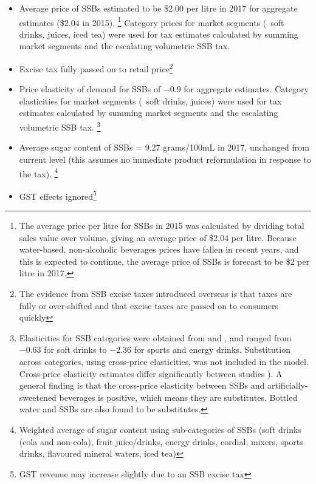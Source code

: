 \documentclass[embargoed]{grattan}
\begin{document}
\begin{itemize}
\item
  Average price of SSBs estimated to be \$2.00 per litre in 2017 for aggregate estimates (\$2.04 in 2015). \footnote{The average price per litre for SSBs in 2015 was calculated by dividing total sales value over volume, giving an average price of \$2.04 per litre.
Because water-based, non-alcoholic beverages prices have fallen in recent years, and this is expected to continue, the average price of SSBs is forecast to be \$2 per litre in 2017.} Category prices for market segments (\eg~soft drinks, juices, iced tea) were used for tax estimates calculated by summing market segments and the escalating volumetric SSB tax.
\item
  Excise tax fully passed on to retail price\footnote{The evidence from SSB excise taxes introduced overseas is that taxes are fully or over-shifted and that excise taxes are passed on to consumers quickly}
\item
  Price elasticity of demand for SSBs of \(-0.9\) for aggregate estimates.
Category elasticities for market segments (\eg~soft drinks, juices) were used for tax estimates calculated by summing market segments and the escalating volumetric SSB tax.%
\footnote{Elasticities for SSB categories were obtained from \textcite{Sharma2014effectstaxingsugarsweetened} and \textcite{Zhen2014Predictingeffectssugar}, and ranged from \(-0.63\) for soft drinks to \(-2.36\) for sports and energy drinks.
Substitution across categories, using cross-price elasticities, was not included in the model.
Cross-price elasticity estimates differ significantly between studies \textcite{Organization2016FiscalPoliciesDiet}).
A general finding is that the cross-price elasticity between SSBs and artificially-sweetened beverages is positive, which means they are substitutes.
Bottled water and SSBs are also found to be substitutes.}
\item
  Average sugar content of SSBs = 9.27 grams/100mL in 2017, unchanged from current level (this assumes no immediate product reformulation in response to the tax).%
\footnote{Weighted average of sugar content using sub-categories of SSBs (soft drinks (cola and non-cola), fruit juice/drinks, energy drinks, cordial, mixers, sports drinks, flavoured mineral waters, iced tea)\textcites{rethinksugarydrink2016Howmuchsugar}{HealthCth2014FactSheetHow}} 
\item
  GST effects ignored\footnote{GST revenue may increase slightly due to an SSB excise tax}
\end{itemize}
\end{document}
